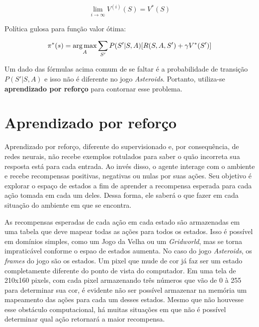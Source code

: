\begin{equation} \label{eq:qvalue}
\lim_{i\to\infty} V^{(i)}(S) = V^{*}(S)
\end{equation}

Política gulosa para função valor ótima:

\begin{equation} \label{eq:opt_pol}
\pi^{*}(s) = \operatorname*{arg\,max}_{A}\sum_{S'}P(S'|S,A)[R(S,A,S') + \gamma V^{*}(S')]
\end{equation}

Um dado das fórmulas acima comum de se faltar é a probabilidade de transição $P(S'|S,A)$ e isso não é diferente no jogo \textit{Asteroids}.
Portanto, utiliza-se \textbf{aprendizado por reforço} para contornar esse problema.


\section{Aprendizado por reforço}
\label{sec:rl}

Aprendizado por reforço, diferente do supervisionado e, por consequência, de redes neurais, não recebe exemplos rotulados para saber o quão incorreta sua resposta está para cada entrada.
Ao invés disso, o agente interage com o ambiente e recebe recompensas positivas, negativas ou nulas por suas ações.
Seu objetivo é explorar o espaço de estados a fim de aprender a recompensa esperada para cada ação tomada em cada um deles.
Dessa forma, ele saberá o que fazer em cada situação do ambiente em que se encontra.

As recompensas esperadas de cada ação em cada estado são armazenadas em uma tabela que deve mapear todas as ações para todos os estados.
Isso é possível em domínios simples, como um Jogo da Velha ou um \textit{Gridworld}, mas se torna impraticável conforme o espao de estados aumenta.
No caso do jogo \textit{Asteroids}, os \textit{frames} do jogo são os estados.
Um pixel que mude de cor já faz ser um estado completamente diferente do ponto de vista do computador.
Em uma tela de 210x160 pixels, com cada pixel armazenando três números que vão de 0 à 255 para determinar sua cor, é evidente não ser possível armazenar na memória um mapeamento das ações para cada um desses estados.
Mesmo que não houvesse esse obstáculo computacional, há muitas situações em que não é possível determinar qual ação retornará a maior recompensa.

